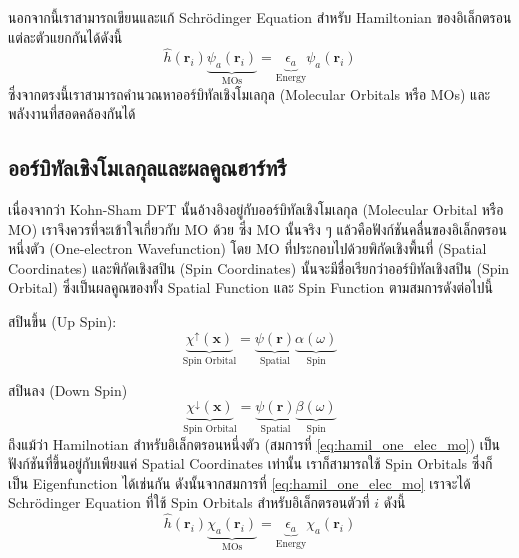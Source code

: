 นอกจากนี้เราสามารถเขียนและแก้ Schr\"{o}dinger Equation สำหรับ Hamiltonian ของอิเล็กตรอนแต่ละตัวแยกกันได้ดังนี้
%
\begin{equation}\label{eq:hamil_one_elec_mo}
    \hat{h}(\bm{r}_{i}) \underbrace{\psi_{a}(\bm{r}_{i})}_{\text{MOs}} =
    \underbrace{\epsilon_{a}}_{\text{Energy}} \psi_{a}(\bm{r}_{i})
\end{equation}
%
\noindent ซึ่งจากตรงนี้เราสามารถคำนวณหาออร์บิทัลเชิงโมเลกุล (Molecular Orbitals หรือ MOs) และพลังงานที่สอดคล้องกันได้

\subsection{ออร์บิทัลเชิงโมเลกุลและผลคูณฮาร์ทรี}
\label{ssec:mol_orb_hartree_prod}

เนื่องจากว่า Kohn-Sham DFT นั้นอ้างอิงอยู่กับออร์บิทัลเชิงโมเลกุล (Molecular Orbital หรือ MO) เราจึงควรที่จะเข้าใจเกี่ยวกับ MO ด้วย ซึ่ง MO นั้นจริง ๆ แล้วคือฟังก์ชันคลื่นของอิเล็กตรอนหนึ่งตัว (One-electron Wavefunction) โดย MO ที่ประกอบไปด้วยพิกัดเชิงพื้นที่ (Spatial Coordinates) และพิกัดเชิงสปิน (Spin Coordinates) นั้นจะมีชื่อเรียกว่าออร์บิทัลเชิงสปิน (Spin Orbital) ซึ่งเป็นผลคูณของทั้ง Spatial Function และ Spin Function ตามสมการดังต่อไปนี้

\noindent สปินขึ้น (Up Spin):
%
\begin{equation}\label{eq:hamil_spin_orb_up}
    \underbrace{\chi^{\uparrow}(\bm{x})}_{\text{Spin Orbital}} =
    \underbrace{\psi(\bm{r})}_{\text{Spatial}} \underbrace{\alpha(\omega)}_{\text{Spin}}
\end{equation}

\noindent สปินลง (Down Spin)
%
\begin{equation}\label{eq:hamil_spin_orb_down}
    \underbrace{\chi^{\downarrow}(\bm{x})}_{\text{Spin Orbital}} =
    \underbrace{\psi(\bm{r})}_{\text{Spatial}} \underbrace{\beta(\omega)}_{\text{Spin}}
\end{equation}
%
\noindent ถึงแม้ว่า Hamilnotian สำหรับอิเล็กตรอนหนึ่งตัว (สมการที่ \eqref{eq:hamil_one_elec_mo}) เป็นฟังก์ชันที่ขึ้นอยู่กับเพียงแค่ Spatial Coordinates เท่านั้น เราก็สามารถใช้ Spin Orbitals ซึ่งก็เป็น Eigenfunction ได้เช่นกัน ดังนั้นจากสมการที่ \eqref{eq:hamil_one_elec_mo} เราจะได้ Schr\"{o}dinger Equation ที่ใช้ Spin Orbitals สำหรับอิเล็กตรอนตัวที่ $i$ ดังนี้
%
\begin{equation}\label{eq:hamil_spin_orb}
    \hat{h}(\bm{r}_{i}) \underbrace{\chi_{a}(\bm{r}_{i})}_{\text{MOs}} =
    \underbrace{\epsilon_{a}}_{\text{Energy}} \chi_{a}(\bm{r}_{i})
\end{equation}


